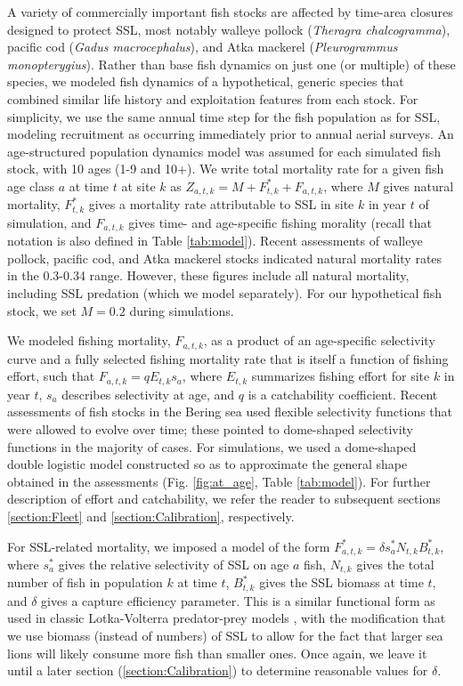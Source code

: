 \documentclass[nonumbib,leqno]{nrc1}
\begin{document}
A variety of commercially important fish stocks are affected by time-area closures designed to protect SSL, most notably walleye pollock ({\it Theragra chalcogramma}), pacific cod ({\it Gadus macrocephalus}), and Atka mackerel ({\it Pleurogrammus monopterygius}).  Rather than base fish dynamics on just one (or multiple) of these species, we modeled fish dynamics of a hypothetical, generic species that combined similar life history and exploitation features from each stock.  For simplicity, we use the same annual time step for the fish population as for SSL, modeling recruitment as occurring immediately prior to annual aerial surveys.  An age-structured population dynamics model was assumed for each simulated fish stock, with 10 ages (1-9 and 10+).
We write total mortality rate for a given fish age class $a$ at time $t$ at site $k$ as $Z_{a,t,k}=M + F_{t,k}^* + F_{a,t,k}$, where $M$ gives
natural mortality, $F_{t,k}^*$ gives a mortality rate attributable to SSL in site $k$ in year $t$ of simulation, and $F_{a,t,k}$ gives time- and age-specific fishing morality (recall that notation is also defined in Table \ref{tab:model}).  Recent assessments of walleye pollock, pacific cod, and Atka mackerel stocks \citep[e.g.][]{PollockAssessment2011,PacCodAssessment2011,AtkaAssessment2012} indicated natural mortality rates in the 0.3-0.34 range.  However, these figures include all natural mortality, including SSL predation (which we model separately).  For our hypothetical fish stock, we set $M=0.2$ during simulations.

We modeled fishing mortality, $F_{a,t,k}$, as a product of an age-specific selectivity curve and a fully selected fishing mortality rate that is itself a function of fishing effort, such that $F_{a,t,k}=q E_{t,k} s_a$, where $E_{t,k}$ summarizes fishing effort for site $k$ in year $t$, $s_a$ describes selectivity at age, and $q$ is a catchability coefficient.  Recent assessments of fish stocks in the Bering sea used flexible selectivity functions that were allowed to evolve over time; these pointed to dome-shaped selectivity functions in the majority of cases.  For simulations, we used a dome-shaped double logistic model constructed so as to approximate the general shape obtained in the assessments (Fig. \ref{fig:at_age}, Table \ref{tab:model}).  For further description of effort and catchability, we refer the reader to subsequent sections \ref{section:Fleet} and \ref{section:Calibration}, respectively.

For SSL-related mortality, we imposed a model of the form $F_{a,t,k}^*=\delta s_a^* N_{t,k} B_{t,k}^*$, where $s_a^*$ gives the relative selectivity of SSL on age $a$ fish, $N_{t,k}$ gives the total number of fish in population $k$ at time $t$, $B_{t,k}^*$ gives the SSL biomass at time $t$, and $\delta$ gives a capture efficiency parameter. This is a similar functional form as used in classic Lotka-Volterra predator-prey models \citep[see e.g.][]{Gotelli2001}, with the modification that we use biomass (instead of numbers) of SSL to allow for the fact that larger sea lions will likely consume more fish than smaller ones.  Once again, we leave it until a later section (\ref{section:Calibration}) to determine reasonable values for $\delta$.
\end{document}

